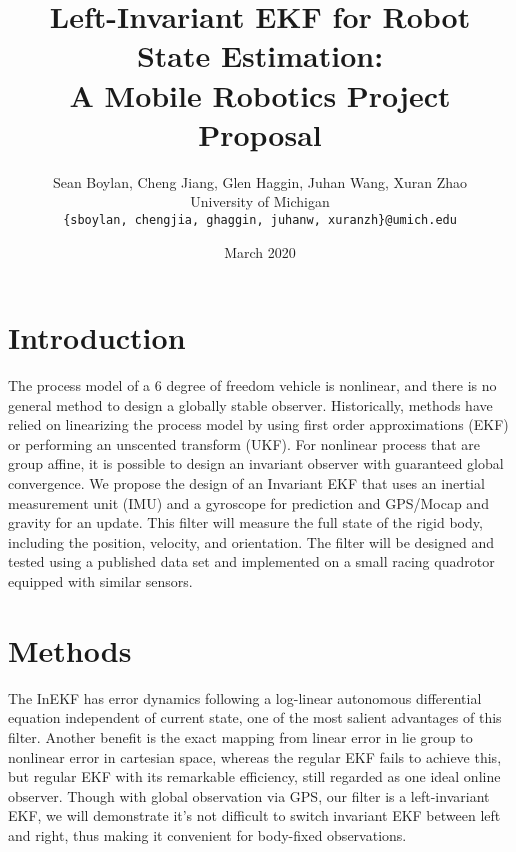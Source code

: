 \documentclass{IEEEtran}
\title{Left-Invariant EKF for Robot State Estimation:\\%
A Mobile Robotics Project Proposal}
\author{Sean Boylan, Cheng Jiang, Glen Haggin, Juhan Wang, Xuran Zhao\\
University of Michigan\\
\texttt{\{sboylan, chengjia, ghaggin, juhanw, xuranzh\}@umich.edu}
}
\date{March 2020}
\begin{document}
\maketitle
\section{Introduction}
The process model of a 6 degree of freedom vehicle is nonlinear, and there is no general method to design a globally stable observer.  Historically, methods have relied on linearizing the process model by using first order approximations (EKF) or performing an unscented transform (UKF)\cite{thrun2005probabilistic}. %
For nonlinear process that are group affine, it is possible to design an invariant observer with guaranteed global convergence\cite{InEKF_Barrau}. We propose the design of an Invariant EKF that uses an inertial measurement unit (IMU) and a gyroscope for prediction and GPS/Mocap and gravity for an update. This filter will measure the full state of the rigid body, including the position, velocity, and orientation. The filter will be designed and tested using a published data set and implemented on a small racing quadrotor equipped with similar sensors.
%
\section{Methods}
The InEKF has error dynamics following a log-linear autonomous differential equation independent of current state, one of the most salient advantages of this filter. Another benefit is the exact mapping from linear error in lie group to nonlinear error in cartesian space, whereas the regular EKF fails to achieve this, but regular EKF with its remarkable efficiency, still regarded as one ideal online observer. Though with global observation via GPS, our filter is a left-invariant EKF, we will demonstrate it's not difficult to switch invariant EKF between left and right, thus making it convenient for body-fixed observations.
%
\end{document}
